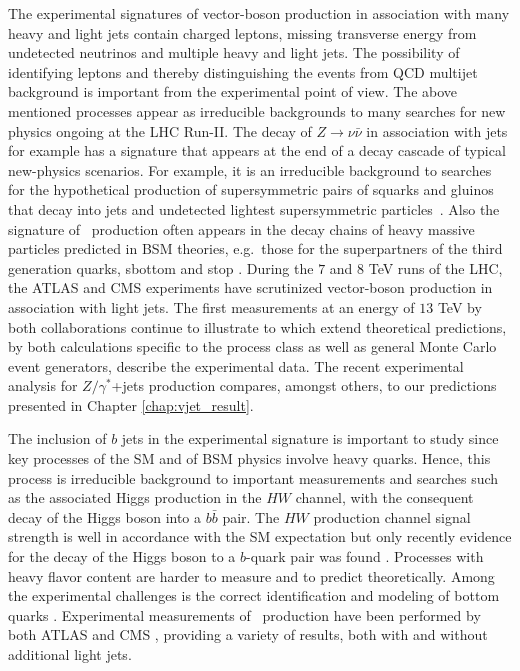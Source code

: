 The experimental signatures of vector-boson production in association
with many heavy and light jets contain charged leptons, missing
transverse energy from undetected neutrinos and multiple heavy and light jets. The possibility of identifying leptons and thereby
distinguishing the events from QCD multijet background is important from the experimental point of view. The above mentioned processes appear as irreducible backgrounds to many searches for new physics ongoing at the LHC Run-II. The decay of $Z\rightarrow
\nu\bar{\nu}$ in association with jets for example has a signature
that appears at the end of a decay cascade of typical new-physics
scenarios. For example, it is an irreducible background to searches for the hypothetical production of
supersymmetric pairs of squarks and gluinos that decay into jets and
undetected lightest supersymmetric
particles~\cite{Collaboration:2011ida,Aad:2011ib,Chatrchyan:2014lfa,Aad:2014wea,Khachatryan:2016kdk,Aaboud:2017vwy}. Also the signature of \Wbb~production often appears in the
decay chains of heavy massive particles predicted in BSM theories, e.g.~those for the superpartners of the
third generation quarks, sbottom and stop \cite{ATLASCollaboration2015,ATLAS13sbottom16,ATLAS13sbottom17}. During the $7$ and $8$
  TeV runs of the LHC, the ATLAS \cite{Aad:2012en,Aad:2011qv,Aad:2010ab,Aad:2011xn,ATLASRatioWZ14,Aad:2014qxa,ATLAS7Zjets13,ATLAS:ratio2017}
and CMS
\cite{Khachatryan:2014uva,Chatrchyan:2011ne,Chatrchyan:2013tna,CMS7Zjets15,Khachatryan:2016fue,Khachatryan:2015ira,CMS8Zjets16}
experiments have scrutinized vector-boson production in association
with light jets. The first measurements at an
energy of $13$ TeV by both
collaborations \cite{Aaboud:2017hbk,Sirunyan:2017wgx} continue to illustrate
to which extend theoretical predictions, by both calculations specific
to the process class as well as general Monte Carlo event generators, describe
the experimental data. The recent experimental
analysis for $Z/\gamma^*$+jets production \cite{Aaboud:2017hbk}
compares, amongst others, to our predictions \cite{Anger:2017nkq} presented in Chapter
\ref{chap:vjet_result}. 

The inclusion of $b$ jets in the experimental signature is important to
study since key processes of the SM and of BSM physics involve heavy quarks. Hence, this process is irreducible
background to important measurements and searches such as the associated Higgs production in the $HW$ channel, with the consequent decay of
the Higgs boson into a $b\bar{b}$ pair. The $HW$ production
channel signal strength is well in accordance with the SM expectation
\cite{ATLAS2015Higgs} but only recently evidence for the
decay of the Higgs boson to a $b$-quark pair was found
\cite{ATLAS:hbb2017}. Processes with heavy
flavor content are harder to measure and to predict
theoretically. Among the experimental challenges is the correct
identification and modeling of bottom quarks \cite{ATLASbtag}. Experimental measurements of \Wbb~production have been performed by
both ATLAS \cite{Aad:2013vka} and CMS \cite{CMS:2016bb,Chatrchyan:2013uza},
providing a variety of results, both with and without additional light
jets.

